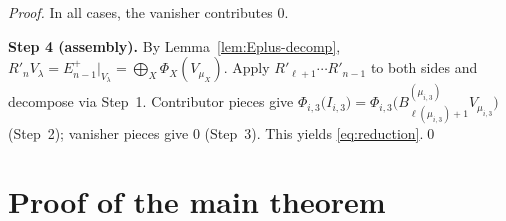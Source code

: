 \documentclass[11pt]{article}
\theoremstyle{definition}
\newcommand{\Vlam}{V_\lambda}
\newcommand{\Rp}{{R'}}
\begin{document}
\begin{proof}
In all cases, the vanisher contributes $0$.

\medskip\textbf{Step 4 (assembly).}  By
Lemma~\ref{lem:Eplus-decomp}, $\Rp_n \Vlam = E_{n-1}^+|_{\Vlam} =
\bigoplus_X \Phi_X(V_{\mu_X})$.  Apply
$\Rp_{\ell+1} \cdots \Rp_{n-1}$ to both sides and decompose via
Step~1.  Contributor pieces give $\Phi_{i,3}\bigl(I_{i,3}\bigr) =
\Phi_{i,3}\bigl(B^{(\mu_{i,3})}_{\ell(\mu_{i,3})+1} V_{\mu_{i,3}}\bigr)$
(Step~2); vanisher pieces give $0$ (Step~3).  This yields
\eqref{eq:reduction}.\qed
\end{proof}

\section{Proof of the main theorem}\label{sec:main-proof}
\end{document}

